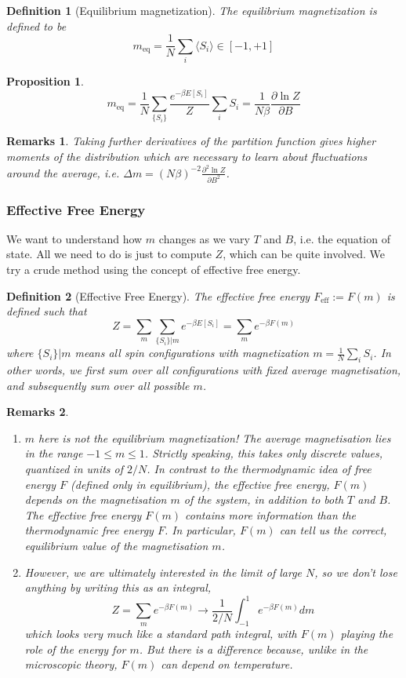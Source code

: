 \documentclass[a4paper]{article}
\newtheorem{remarks}{Remarks}[section]
\theoremstyle{new}
\newtheorem{defi}{Definition}[section]
\newtheorem{prop}{Proposition}[section]
\begin{document}
\begin{defi}[Equilibrium magnetization]
The equilibrium magnetization is defined to be
$$m_{\text{eq}}=\frac{1}{N}\sum_i\langle S_i\rangle\in[-1,+1]$$
\end{defi}
\begin{prop}
$$m_{\text{eq}}=\frac{1}{N}\sum_{\{S_i\}}\frac{e^{-\beta E[S_i]}}{Z}\sum_iS_i=\frac{1}{N\beta}\frac{\partial \ln Z}{\partial B}$$
\end{prop}
\begin{remarks}
Taking further derivatives of the partition function gives higher moments of the distribution which are necessary to learn about fluctuations around the average, i.e. $\Delta m=(N\beta)^{-2}\frac{\partial^2\ln Z}{\partial B^2}$.
\end{remarks}
\subsubsection{Effective Free Energy}
We want to understand how $m$ changes as we vary $T$ and $B$, i.e. the equation of state. All we need to do is just to compute $Z$, which can be quite involved. We try a crude method using the concept of effective free energy.
\begin{defi}[Effective Free Energy]
The effective free energy $F_{\text{eff}}:=F(m)$ is defined such that
$$Z=\sum_m\sum_{\{S_i\}|m}e^{-\beta E[S_i]}=\sum_me^{-\beta F(m)}$$
where $\{S_i\}|m$ means all spin configurations with magnetization $m=\frac{1}{N}\sum_iS_i$. In other words, we first sum over all configurations with fixed average magnetisation, and subsequently sum over all possible $m$. 
\end{defi}
\begin{remarks}\leavevmode
\begin{enumerate}
\item $m$ here is not the equilibrium magnetization! The average magnetisation lies in the range $-1\leq m\leq 1$. Strictly speaking, this takes only discrete values, quantized in units of $2/N$. In contrast to the thermodynamic idea of free energy $F$ (defined only in equilibrium), the effective free energy, $F(m)$ depends on the magnetisation $m$ of the system, in addition to both $T$ and $B$. The effective free energy $F(m)$ contains more information than the thermodynamic free energy $F$. In particular, $F(m)$ can tell us the correct, equilibrium value of the magnetisation $m$. 
\item However, we are ultimately interested in the limit of large $N$, so we don’t lose anything by writing this as an integral,
$$Z=\sum_me^{-\beta F(m)}\rightarrow\frac{1}{2/N}\int_{-1}^1e^{-\beta F(m)}dm$$
which looks very much like a standard path integral, with $F(m)$ playing the role of the energy for $m$. But there is a difference because, unlike in the microscopic theory, $F(m)$ can depend on temperature.
\end{enumerate}
\end{remarks}
\end{document}
